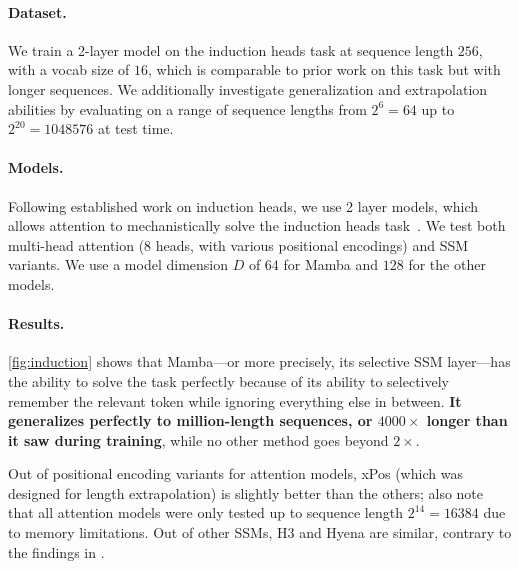 \paragraph{Dataset.}
We train a 2-layer model on the induction heads task at sequence length $256$, with a vocab size of $16$,
which is comparable to prior work on this task \citep{dao2023hungry} but with longer sequences.
We additionally investigate generalization and extrapolation abilities by evaluating on a range of sequence lengths from $2^6 = 64$ up to $2^{20} = 1048576$ at test time.

\paragraph{Models.}
Following established work on induction heads, we use 2 layer models, which allows attention to mechanistically solve the induction heads task~\citep{olsson2022context}.
We test both multi-head attention (8 heads, with various positional encodings) and SSM variants.
We use a model dimension $D$ of $64$ for Mamba and $128$ for the other models.

\paragraph{Results.}

\cref{fig:induction} shows that
Mamba---or more precisely, its selective SSM layer---has the ability to solve the task perfectly because of its ability to selectively remember the relevant token while ignoring everything else in between.
\textbf{It generalizes perfectly to million-length sequences, or $4000\times$ longer than it saw during training},
while no other method goes beyond $2\times$.

Out of positional encoding variants for attention models, xPos (which was designed for length extrapolation) is slightly better than the others;
also note that all attention models were only tested up to sequence length $2^{14}=16384$ due to memory limitations.
Out of other SSMs, H3 and Hyena are similar, contrary to the findings in \citet{poli2023hyena}.

%




